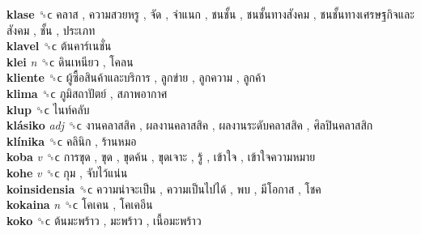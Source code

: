 \textbf{klase} ␝ϲ   คลาส ,  ความสวยหรู ,  จัด ,  จำแนก ,  ชนชั้น ,  ชนชั้นทางสังคม ,  ชนชั้นทางเศรษฐกิจและสังคม ,  ชั้น ,  ประเภท   \\
\textbf{klavel} ␝ϲ   ต้นคาร์เนชั่น   \\
\textbf{klei} \emph{n}  ␝ϲ   ดินเหนียว ,  โคลน   \\
\textbf{kliente} ␝ϲ   ผู้ซื้อสินค้าและบริการ ,  ลูกข่าย ,  ลูกความ ,  ลูกค้า   \\
\textbf{klima} ␝ϲ   ภูมิสถาปัตย์ ,  สภาพอากาศ   \\
\textbf{klup} ␝ϲ   ไนท์คลับ   \\
\textbf{klásiko} \emph{adj}  ␝ϲ   งานคลาสสิค ,  ผลงานคลาสสิค ,  ผลงานระดับคลาสสิค ,  ศิลปินคลาสสิก   \\
\textbf{klínika} ␝ϲ   คลินิก ,  ร้านหมอ   \\
\textbf{koba} \emph{v}  ␝ϲ   การขุด ,  ขุด ,  ขุดค้น ,  ขุดเจาะ ,  รู้ ,  เข้าใจ ,  เข้าใจความหมาย   \\
\textbf{kohe} \emph{v}  ␝ϲ   กุม ,  จับไว้แน่น   \\
\textbf{koinsidensia} ␝ϲ   ความน่าจะเป็น ,  ความเป็นไปได้ ,  พบ ,  มีโอกาส ,  โชค   \\
\textbf{kokaina} \emph{n}  ␝ϲ   โคเคน ,  โคเคอีน   \\
\textbf{koko} ␝ϲ   ต้นมะพร้าว ,  มะพร้าว ,  เนื้อมะพร้าว   \\

